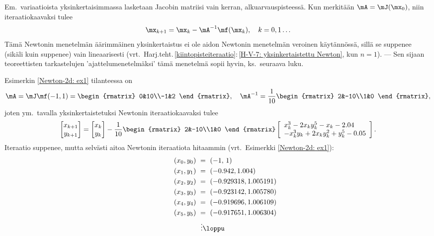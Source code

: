 Em.\ variaatioista yksinkertaisimmassa lasketaan Jacobin matriisi vain kerran,
alkuarvauspisteessä. Kun merkitään $\mA=\mJ(\mx_0)$, niin iteraatiokaavaksi tulee
\[
\mx_{k+1}=\mx_k-\mA^{-1}\mf(\mx_k), \quad k=0,1\ldots
\]
Tämä Newtonin menetelmän äärimmäinen yksinkertaistus ei ole aidon Newtonin menetelmän veroinen
käytännössä, sillä se suppenee (sikäli kuin suppenee) vain lineaarisesti 
(vrt.\ Harj.teht.\,\ref{kiintopisteiteraatio}:\,\ref{H-V-7: yksinkertaistettu Newton},
kun $n=1$). --- Sen sijaan teoreettisten tarkastelujen 'ajattelumenetelmäksi' tämä menetelmä
sopii hyvin, ks.\ seuraava luku. 
\begin{Exa} Esimerkin \ref{Newton-2d: ex1} tilanteessa on
\[
\mA=\mJ\mf(-1,1)= \begin{rmatrix} 0&10\\-1&2 \end{rmatrix}, \quad
\mA^{-1}=\frac{1}{10}\begin{rmatrix} 2&-10\\1&0 \end{rmatrix},
\]
joten ym.\ tavalla yksinkertaistetuksi Newtonin iteraatiokaavaksi tulee
\[
\begin{bmatrix} x_{k+1}\\y_{k+1} \end{bmatrix} 
   = \begin{bmatrix} x_k\\y_k \end{bmatrix}
         -\frac{1}{10}\begin{rmatrix} 2&-10\\1&0 \end{rmatrix}
         \left[\begin{array}{l} 
               x_k^3-2x_ky_k^5-x_k-2.04\\-x_k^3y_k+2x_ky_k^2+y_k^5-0.05 
               \end{array}\right].
\]
Iteraatio suppenee, mutta selvästi aitoa Newtonin iteraatiota hitaammin
(vrt.\ Esimerkki \ref{Newton-2d: ex1}):
\begin{align*}
\qquad (x_0,y_0)\ &=\ (-1,\,1) \\
       (x_1,y_1)\ &=\ (-0.942,1.004) \\
       (x_2,y_2)\ &=\ (-0.929318,1.005191) \\
       (x_3,y_3)\ &=\ (-0.923142,1.005780) \\
       (x_4,y_4)\ &=\ (-0.919696,1.006109) \\
       (x_5,y_5)\ &=\ (-0.917651,1.006304) \\
                  &\ \vdots \loppu
\end{align*}
\end{Exa}

